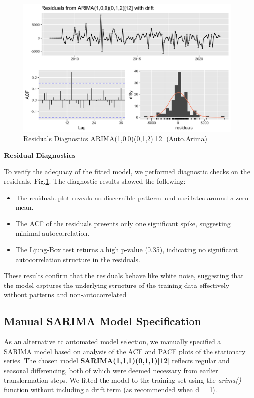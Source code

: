 \begin{figure}[H]
    \centering
    \includegraphics[width=1\linewidth]{images/residual_auto.png}
    \caption{Residuals Diagnostics ARIMA(1,0,0)(0,1,2)[12] (Auto.Arima)}
    \label{fig:residual_auto}
\end{figure}

\noindent\textbf{Residual Diagnostics}

To verify the adequacy of the fitted model, we performed diagnostic checks on the residuals, Fig.\ref{fig:residual_auto}. The diagnostic results showed the following:

\begin{itemize}
    \item The residuals plot reveals no discernible patterns and oscillates around a zero mean.
    \item The ACF of the residuals presents only one significant spike, suggesting minimal autocorrelation.
    \item The Ljung-Box test returns a high p-value (0.35), indicating no significant autocorrelation structure in the residuals.
\end{itemize}

These results confirm that the residuals behave like white noise, suggesting that the model captures the underlying structure of the training data effectively without patterns and non-autocorrelated.

\subsection{Manual SARIMA Model Specification}

As an alternative to automated model selection, we manually specified a SARIMA model based on analysis of the ACF and PACF plots of the stationary series. The chosen model \textbf{SARIMA(1,1,1)(0,1,1)[12]} reflects regular and seasonal differencing, both of which were deemed necessary from earlier transformation steps. We fitted the model to the training set using the \textit{arima()} function without including a drift term (as recommended when d = 1).

